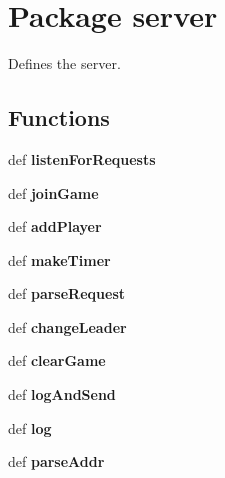 \hypertarget{namespaceserver}{
\section{Package server}
\label{namespaceserver}
}


Defines the server.  


\subsection*{Functions}
\begin{DoxyCompactItemize}
\item 
\hypertarget{namespaceserver_a30e130aa4d3cd49c4cffac5dddb6e81d}{
def {\bfseries listenForRequests}}
\label{namespaceserver_a30e130aa4d3cd49c4cffac5dddb6e81d}

\item 
\hypertarget{namespaceserver_a52bebc72026b54aae5f0f2f44166eecb}{
def {\bfseries joinGame}}
\label{namespaceserver_a52bebc72026b54aae5f0f2f44166eecb}

\item 
\hypertarget{namespaceserver_ab533b87d24f748982c5a5a05fb0679da}{
def {\bfseries addPlayer}}
\label{namespaceserver_ab533b87d24f748982c5a5a05fb0679da}

\item 
\hypertarget{namespaceserver_a308bcc701ebae822a6d5f7bffbe1f540}{
def {\bfseries makeTimer}}
\label{namespaceserver_a308bcc701ebae822a6d5f7bffbe1f540}

\item 
\hypertarget{namespaceserver_ad7cd6bf89ff431f488a106b303a78f56}{
def {\bfseries parseRequest}}
\label{namespaceserver_ad7cd6bf89ff431f488a106b303a78f56}

\item 
\hypertarget{namespaceserver_a1684ade683d94a0242747dc88ea2fa4d}{
def {\bfseries changeLeader}}
\label{namespaceserver_a1684ade683d94a0242747dc88ea2fa4d}

\item 
\hypertarget{namespaceserver_ae2512251379da8233daea6ce120480d5}{
def {\bfseries clearGame}}
\label{namespaceserver_ae2512251379da8233daea6ce120480d5}

\item 
\hypertarget{namespaceserver_a716ae541aad9f8416c3d747cae8ea250}{
def {\bfseries logAndSend}}
\label{namespaceserver_a716ae541aad9f8416c3d747cae8ea250}

\item 
\hypertarget{namespaceserver_ae8502fbd808dc8930c0b9c17ea2443d3}{
def {\bfseries log}}
\label{namespaceserver_ae8502fbd808dc8930c0b9c17ea2443d3}

\item 
\hypertarget{namespaceserver_a68d6b7c9005e686c3b9c963273ef1f12}{
def {\bfseries parseAddr}}
\label{namespaceserver_a68d6b7c9005e686c3b9c963273ef1f12}

\end{DoxyCompactItemize}
